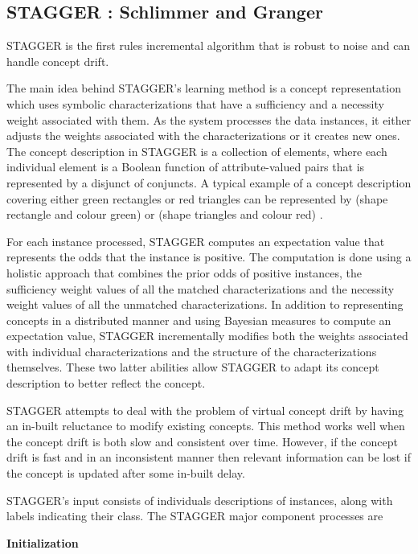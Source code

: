 \BEGINOMIT
\subsection{STAGGER : Schlimmer and Granger}


STAGGER is the first rules incremental algorithm that is robust to noise and can handle concept drift.

The main idea behind STAGGER's learning method is a concept representation
which uses symbolic characterizations that have a sufficiency and a necessity weight associated
with them. As the system processes the data instances, it either adjusts the weights associated
with the characterizations or it creates new ones. The concept description in STAGGER is a
collection of elements, where each individual element is a Boolean function of attribute-valued
pairs that is represented by a disjunct of conjuncts. A typical example of a concept description
covering either green rectangles or red triangles can be represented by (shape rectangle and colour
green) or (shape triangles and colour red) .

For each instance processed, STAGGER computes an expectation value that represents the odds
that the instance is positive. The computation is done using a holistic approach that combines the
prior odds of positive instances, the sufficiency weight values of all the matched characterizations
and the necessity weight values of all the unmatched characterizations.
In addition to representing concepts in a distributed manner and using Bayesian measures to
compute an expectation value, STAGGER incrementally modifies both the weights associated with
individual characterizations and the structure of the characterizations themselves. These two latter
abilities allow STAGGER to adapt its concept description to better reflect the concept.

STAGGER attempts to deal with the problem of virtual concept drift by having an in-built
reluctance to modify existing concepts. This method works well when the concept drift is both
slow and consistent over time.
However, if the concept drift is fast and in an inconsistent manner then relevant information
can be lost if the concept is updated after some in-built delay.

STAGGER's input consists of individuals descriptions of instances, along with labels indicating their class.
The STAGGER major component processes are

{\bf Initialization}

